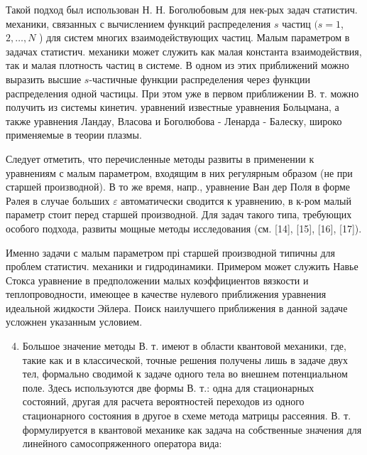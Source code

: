 \documentclass[10pt]{article}
\begin{document}
Такой подход был использован Н. Н. Боголюбовым для нек-рых задач статистич. механики, связанных с вычислением функций распределения $s$ частиц $(s=1$, $2, \ldots, N$ ) для систем многих взаимодействующих частиц. Малым параметром в задачах статистич. механики может служить как малая константа взаимодействия, так и малая плотность частиц в системе. В одном из этих приближений можно выразить высшие $s$-частичные функции распределения через функции распределения одной частицы. При этом уже в первом приближении В. т. можно получить из системы кинетич. уравнений известные уравнения Больцмана, а также уравнения Ландау, Власова и Боголюбова - Ленарда - Балеску, широко применяемые в теории плазмы.



Следует отметить, что перечисленные методы развиты в применении к уравнениям с малым параметром, входящим в них регулярным образом (не при старшей производной). В то же время, напр., уравнение Ван дер Поля в форме Рәлея в случае больших $\varepsilon$ автоматически сводится к уравнению, в к-ром малый параметр стоит перед старшей производной. Для задач такого типа, требующих особого подхода, развиты мощные методы исследования (см. [14], [15], [16], [17]).



Именно задачи с малым параметром прі старшей производной типичны для проблем статистич. механики и гидродинамики. Примером может служить Навье Стокса уравнение в предположении малых коэффициентов вязкости и теплопроводности, имеющее в качестве нулевого приближения уравнения идеальной жидкости Эйлера. Поиск наилучшего приближения в данной задаче усложнен указанным условием.



\begin{enumerate}

  \setcounter{enumi}{3}

  \item Большое значение методы В. т. имеют в области квантовой механики, где, такие как и в классической, точные решения получены лишь в задаче двух тел, формально сводимой к задаче одного тела во внешнем потенциальном поле. Здесь используются две формы В. т.: одна для стационарных состояний, другая для расчета вероятностей переходов из одного стационарного состояния в другое в схеме метода матрицы рассеяния. В. т. формулируется в квантовой механике как задача на собственные значения для линейного самосопряженного оператора вида:

\end{enumerate}
\end{document}
